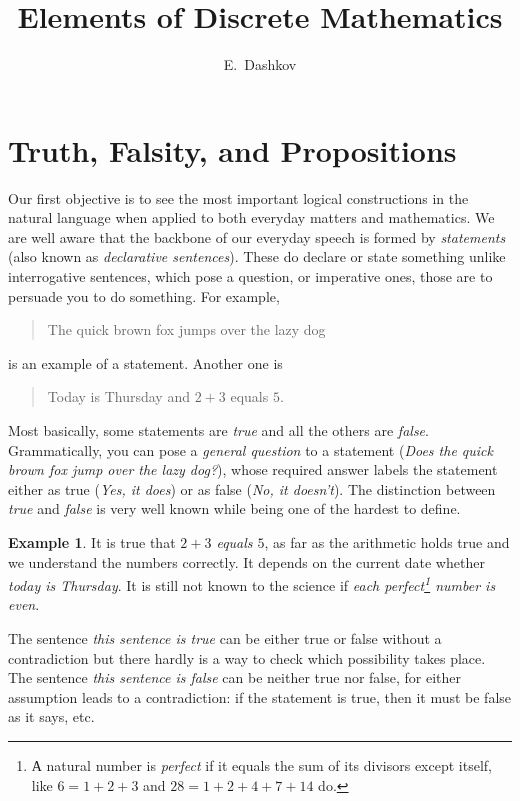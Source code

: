 \documentclass[12pt,notitlepage]{article}
\title{Elements of Discrete Mathematics}
\author{E.~Dashkov}
\theoremstyle{plain}
\theoremstyle{definition}
\newtheorem{exm}[thm]{Example}
\theoremstyle{plain}
\newcommand{\1}{\mathbf{1}}
\newcommand{\0}{\mathbf{0}}
\newcommand{\mcomm}[1]{}
\begin{document}
\maketitle

\tableofcontents
\newpage

\section{Truth, Falsity, and Propositions}\label{sect:1}

\mcomm{This lecture gives an informal introduction to logic. It is evident from our experience that such an introduction is of much help if the Instructor prefers a formal presentation style later in the Course (as we do). Surely, many details are necessarily omitted from here (most notably, any formal definition of truth). We suggest the Instructor focus on
discussing examples and ideas rather than rigorous definitions. It is also recommended to progress gradually from statements about the `real world' to those of `mathematical' content.}

Our first objective is to see the most important logical constructions in the natural language when applied to both everyday matters and mathematics. We are well aware that the backbone of our everyday speech is formed by \emph{statements} (also known as \emph{declarative sentences}). These do declare or state something unlike interrogative sentences, which pose a question, or imperative ones, those are to persuade you to do something. For example,
\begin{quote}
The quick brown fox jumps over the lazy dog
\end{quote}
is an example of a statement. Another one is
\begin{quote}
Today is Thursday and $2 + 3$ equals $5$.
\end{quote}

Most basically, some statements are \emph{true} and all the others are \emph{false}. Grammatically, you can pose a \emph{general question} to a statement (\emph{Does the quick brown fox jump over the lazy dog?}), whose required answer labels the statement either as true (\emph{Yes, it does}) or as false (\emph{No, it doesn't}).  The distinction between \emph{true} and \emph{false} is very well known while being one of the hardest to define.
\begin{exm}
It is true that \emph{$2 + 3$ equals $5$}, as far as the arithmetic holds true and we understand the numbers correctly. It depends on the current date whether \emph{today is Thursday}. It is still not known to the science if \emph{each perfect\footnote{А natural number is \emph{perfect} if it equals the sum of its divisors except itself, like $6 = 1 + 2 + 3$ and $28 = 1 + 2 + 4 + 7 + 14$ do.} number is even}.

The sentence \emph{this sentence is true} can be either true or false without a contradiction but there hardly is a way to check which possibility takes place. The sentence \emph{this sentence is false} can be neither true nor false, for either assumption leads to a contradiction: if the statement is true, then it must be false as it says, etc.
\end{exm}
\end{document}
